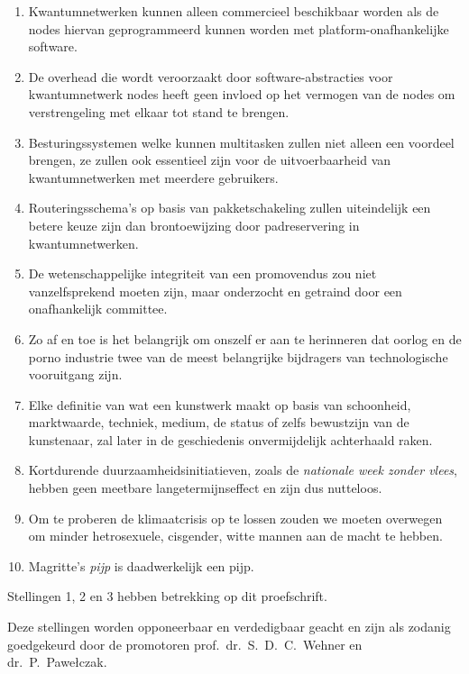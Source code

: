 \begin{enumerate}[widest=10]
    \item Kwantumnetwerken kunnen alleen commercieel beschikbaar worden als de nodes hiervan
          geprogrammeerd kunnen worden met platform-onafhankelijke software.
    \item De overhead die wordt veroorzaakt door software-abstracties voor kwantumnetwerk nodes
          heeft geen invloed op het vermogen van de nodes om verstrengeling met elkaar tot stand te
          brengen.
    \item Besturingssystemen welke kunnen multitasken zullen niet alleen een voordeel brengen, ze
          zullen ook essentieel zijn voor de uitvoerbaarheid van kwantumnetwerken met meerdere
          gebruikers.
    \item Routeringsschema's op basis van pakketschakeling zullen uiteindelijk een betere keuze zijn
          dan brontoewijzing door padreservering in kwantumnetwerken.
    \item De wetenschappelijke integriteit van een promovendus zou niet vanzelfsprekend moeten zijn,
          maar onderzocht en getraind door een onafhankelijk committee.
    \item Zo af en toe is het belangrijk om onszelf er aan te herinneren dat oorlog en de porno
          industrie twee van de meest belangrijke bijdragers van technologische vooruitgang zijn.
    \item Elke definitie van wat een kunstwerk maakt op basis van schoonheid, marktwaarde, techniek,
          medium, de status of zelfs bewustzijn van de kunstenaar, zal later in de geschiedenis
          onvermijdelijk achterhaald raken.
    \item Kortdurende duurzaamheidsinitiatieven, zoals de \emph{nationale week zonder vlees}, hebben
          geen meetbare langetermijnseffect en zijn dus nutteloos.
    \item Om te proberen de klimaatcrisis op te lossen zouden we moeten overwegen om minder
          hetrosexuele, cisgender, witte mannen aan de macht te hebben.
    \item Magritte's \emph{pijp} is daadwerkelijk een pijp.
\end{enumerate}

\bigskip \noindent
Stellingen 1, 2 en 3 hebben betrekking op dit proefschrift.

\bigskip \noindent
Deze stellingen worden opponeerbaar en verdedigbaar geacht en zijn als zodanig goedgekeurd door de
promotoren prof.\ dr.\ S.\ D.\ C.\ Wehner en dr.\ P.\ Pawełczak.
